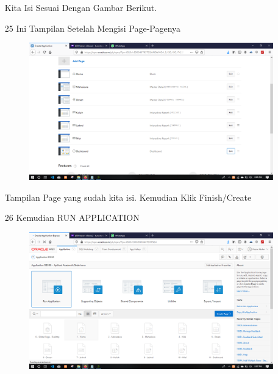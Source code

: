 \begin{enumerate}
\par
Kita Isi Sesuai Dengan Gambar Berikut.

\newpage
\item[25]Ini Tampilan Setelah Mengisi Page-Pagenya

\begin{figure}[!htbp]
    \begin{center}
    \includegraphics[scale=0.2]{figures/28.png}
    \end{center}   
    \end{figure}
    
\par
Tampilan Page yang sudah kita isi. Kemudian Klik Finish/Create 

\item[26]Kemudian RUN APPLICATION

\begin{figure}[!htbp]
    \begin{center}
    \includegraphics[scale=0.2]{figures/29.png}
    \end{center}   
    \end{figure}
    

\end{enumerate}
